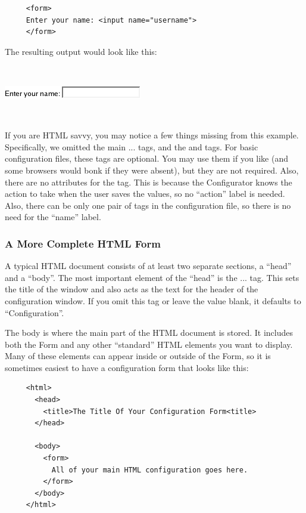 \begin{footnotesize}
\begin{verbatim}
     <form>
     Enter your name: <input name="username">
     </form>
\end{verbatim}
\end{footnotesize}

The resulting output would look like this:

~

\includegraphics[scale=0.5]{figs/EnterYourName}


~


If you are HTML savvy, you may notice a few things missing from this
example. Specifically, we omitted the main ...
tags, and the  and 
tags. For basic configuration files, these tags are optional. You may use
them if you like (and some browsers would bonk if they were absent), but
they are not required.  Also, there are no attributes for the 
tag. This is because the Configurator knows the action to take when the
user saves the values, so no {}``action'' label is needed. Also, there can
be only one pair of  tags in the configuration
file, so there is no need for the {}``name'' label.


\subsubsection*{A More Complete HTML Form}

A typical HTML document consists of at least two separate sections,
a {}``head'' and a {}``body''. The most important element of the
{}``head'' is the ... tag. This sets the title of
the window and also acts as the text for the header of the configuration
window. If you omit this tag or leave the value blank, it defaults
to {}``Configuration''.

The body is where the main part of the HTML document is stored. It
includes both the Form and any other {}``standard'' HTML elements
you want to display. Many of these elements can appear inside or outside
of the Form, so it is sometimes easiest to have a configuration form
that looks like this:

\begin{footnotesize}
\begin{verbatim}
     <html>
       <head>
         <title>The Title Of Your Configuration Form<title>
       </head>

       <body> 
         <form> 
           All of your main HTML configuration goes here.
         </form> 
       </body> 
     </html>
\end{verbatim}
\end{footnotesize}

